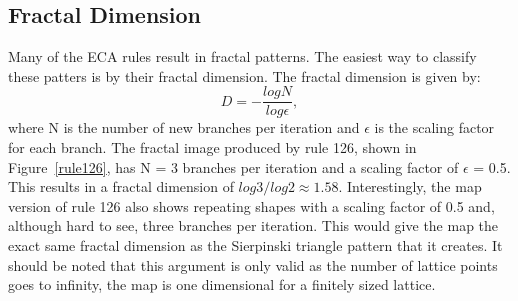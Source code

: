 \subsection{Fractal Dimension}

Many of the ECA rules result in fractal patterns.  The easiest way to classify these patters is by their fractal dimension.  The fractal dimension is given by:
\begin{equation}
	D = - \frac{log N}{log \epsilon},
\end{equation}
where N is the number of new branches per iteration and $\epsilon$ is the scaling factor for each branch.  The fractal image produced by rule 126, shown in Figure~\ref{rule126}, has N = 3 branches per iteration and a scaling factor of $\epsilon$ = 0.5.  This results in a fractal dimension of $log 3/log 2 \approx 1.58$.  Interestingly, the map version of rule 126 also shows repeating shapes with a scaling factor of 0.5 and, although hard to see, three branches per iteration.  This would give the map the exact same fractal dimension as the Sierpinski triangle pattern that it creates.  It should be noted that this argument is only valid as the number of lattice points goes to infinity, the map is one dimensional for a finitely sized lattice.  



